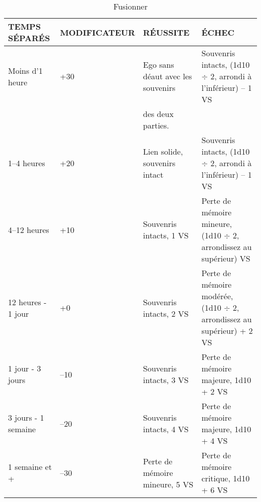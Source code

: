 \begin{table} \caption{Fusionner} \begin{tabular}{|l|l|l|l|} \hline

TEMPS SÉPARÉS &MODIFICATEUR &RÉUSSITE &ÉCHEC\\ \hline

Moins d'1 heure &+30 &Ego sans déaut avec les souvenirs &Souvenris intacts, (1d10 $\div$ 2, arrondi à l'inférieur) – 1 VS \\ &&des deux parties. &\\ \hline

1–4 heures &+20 &Lien solide, souvenirs intact &Souvenris intacts, (1d10 $\div$ 2, arrondi à l'inférieur) – 1 VS \\ \hline

4–12 heures &+10 &Souvenris intacts, 1 VS &Perte de mémoire mineure, (1d10 $\div$ 2, arrondissez au supérieur) VS \\ \hline

12 heures - 1 jour &+0 &Souvenris intacts, 2 VS &Perte de mémoire modérée, (1d10 $\div$ 2, arrondissez au supérieur) + 2 VS \\ \hline

1 jour - 3 jours &–10 &Souvenris intacts, 3 VS &Perte de mémoire majeure, 1d10 + 2 VS \\ \hline

3 jours - 1 semaine &–20 &Souvenris intacts, 4 VS &Perte de mémoire majeure, 1d10 + 4 VS \\ \hline

1 semaine et + &–30 &Perte de mémoire mineure, 5 VS &Perte de mémoire critique, 1d10 + 6 VS \\ \hline

\end{tabular} \label{table:merging} \end{table} 

